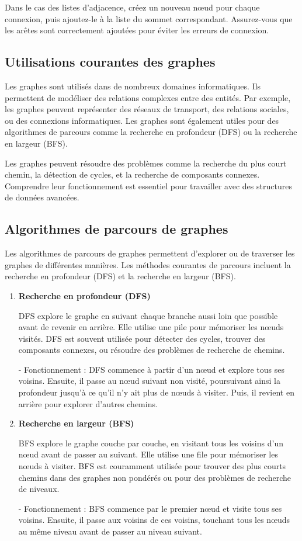 Dans le cas des listes d'adjacence, créez un nouveau nœud pour chaque connexion, puis ajoutez-le à la liste du sommet correspondant. Assurez-vous que les arêtes sont correctement ajoutées pour éviter les erreurs de connexion.

\subsection{Utilisations courantes des graphes}
Les graphes sont utilisés dans de nombreux domaines informatiques. Ils permettent de modéliser des relations complexes entre des entités. Par exemple, les graphes peuvent représenter des réseaux de transport, des relations sociales, ou des connexions informatiques. Les graphes sont également utiles pour des algorithmes de parcours comme la recherche en profondeur (DFS) ou la recherche en largeur (BFS).

Les graphes peuvent résoudre des problèmes comme la recherche du plus court chemin, la détection de cycles, et la recherche de composants connexes. Comprendre leur fonctionnement est essentiel pour travailler avec des structures de données avancées.

\subsection{Algorithmes de parcours de graphes}

Les algorithmes de parcours de graphes permettent d'explorer ou de traverser les graphes de différentes manières. Les méthodes courantes de parcours incluent la recherche en profondeur (DFS) et la recherche en largeur (BFS).

\begin{enumerate}[label=\alph*)]
	\item \textbf{Recherche en profondeur (DFS)}
	
	DFS explore le graphe en suivant chaque branche aussi loin que possible avant de revenir en arrière. Elle utilise une pile pour mémoriser les nœuds visités. DFS est souvent utilisée pour détecter des cycles, trouver des composants connexes, ou résoudre des problèmes de recherche de chemins.
	
	- Fonctionnement : DFS commence à partir d'un nœud et explore tous ses voisins. Ensuite, il passe au nœud suivant non visité, poursuivant ainsi la profondeur jusqu'à ce qu'il n'y ait plus de nœuds à visiter. Puis, il revient en arrière pour explorer d'autres chemins.
	
	\item \textbf{Recherche en largeur (BFS)}
	
	BFS explore le graphe couche par couche, en visitant tous les voisins d'un nœud avant de passer au suivant. Elle utilise une file pour mémoriser les nœuds à visiter. BFS est couramment utilisée pour trouver des plus courts chemins dans des graphes non pondérés ou pour des problèmes de recherche de niveaux.
	
	- Fonctionnement : BFS commence par le premier nœud et visite tous ses voisins. Ensuite, il passe aux voisins de ces voisins, touchant tous les nœuds au même niveau avant de passer au niveau suivant.
	
\end{enumerate}

